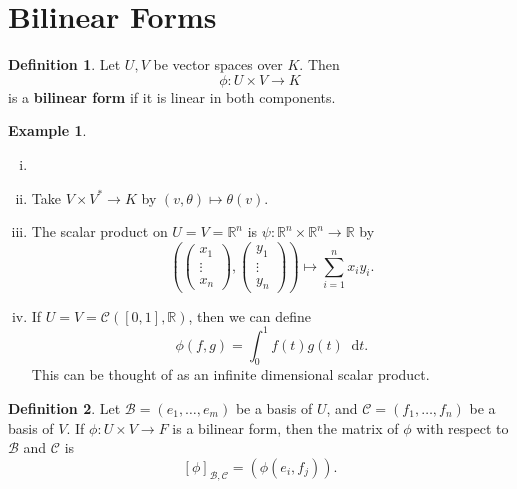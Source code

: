 \documentclass[12pt]{article}
\newcommand{\diff}{\mathop{}\!\mathrm{d}}
\theoremstyle{definition}
\newtheorem{definition}{Definition}[section]
\newtheorem{example}{Example}[section]
\theoremstyle{remark}
\begin{document}
\section{Bilinear Forms}%
\label{sec:bilinear_forms}

\begin{definition}
	Let $U, V$ be vector spaces over $K$. Then
	\[
	\phi : U \times V \to K
	\]
	is a \textbf{bilinear form} if it is linear in both components.
\end{definition}

\begin{adjustbox}{minipage = \columnwidth - 25.5pt, margin=1em, frame=1pt, margin=0em}
\begin{example}
	\begin{enumerate}[(i)]
		\item[]
		\item Take $V \times V^{\ast} \to K$ by $(v, \theta) \mapsto \theta(v)$.
		\item The scalar product on $U = V = \mathbb{R}^{n}$ is $\psi : \mathbb{R}^{n} \times \mathbb{R}^{n} \to \mathbb{R}$ by
			\[
				\left(
					\begin{pmatrix}
						x_1 \\
						\vdots \\
						x_n
					\end{pmatrix},
					\begin{pmatrix}
						y_1 \\
						\vdots \\
						y_n
					\end{pmatrix}
				\right)
				\mapsto  \sum_{i = 1}^{n} x_i y_i
			.\]
		\item If $U = V = \mathcal{C}([0, 1], \mathbb{R})$, then we can define
			\[
				\phi(f, g) = \int_{0}^{1}f(t)g(t) \diff t
			.\]
			This can be thought of as an infinite dimensional scalar product.
	\end{enumerate}
\end{example}
\end{adjustbox}

\begin{definition}
	Let $\mathcal{B} = (e_1, \ldots, e_m)$ be a basis of $U$, and $\mathcal{C} = (f_1, \ldots, f_n)$ be a basis of $V$. If $\phi : U \times V \to F$ is a bilinear form, then the matrix of $\phi$ with respect to $\mathcal{B}$ and $\mathcal{C}$ is
	\[
		[\phi]_{\mathcal{B}, \mathcal{C}} = (\phi(e_i, f_j))
	.\]
\end{definition}
\end{document}
